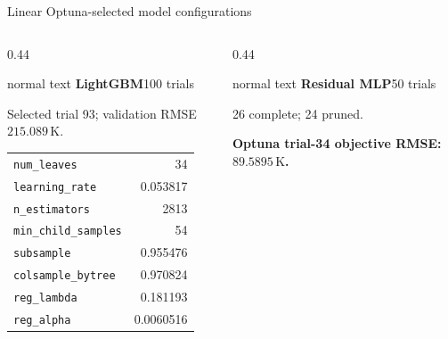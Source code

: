 \documentclass[aspectratio=169,10pt]{beamer}
\begin{document}
\begin{frame}[t]{Linear Optuna-selected model configurations}
  \hypertarget{supp:surrogates-linear-hpo}{}
  \vspace{-0.18cm}\hfill
  \hspace{0.10cm}\GVBackupIndexButton
  \vspace{0.06cm}
  \begin{columns}[T,totalwidth=0.94\textwidth]
    \begin{column}{0.44\textwidth}
      \begin{beamercolorbox}[wd=\linewidth,sep=0.48em]{normal text}
        \small\textbf{\color{GVTeal}LightGBM}\hfill\scriptsize 100 trials\par
        \vspace{0.06cm}\scriptsize Selected trial 93; validation RMSE \(215.089\,\mathrm K\).\par
        \vspace{0.08cm}\scriptsize
        \begin{tabular}{@{}lr@{}}
          \texttt{num\_leaves} & 34\\
          \texttt{learning\_rate} & 0.053817\\
          \texttt{n\_estimators} & 2813\\
          \texttt{min\_child\_samples} & 54\\
          \texttt{subsample} & 0.955476\\
          \texttt{colsample\_bytree} & 0.970824\\
          \texttt{reg\_lambda} & 0.181193\\
          \texttt{reg\_alpha} & 0.0060516
        \end{tabular}
      \end{beamercolorbox}
    \end{column}
    \begin{column}{0.44\textwidth}
      \begin{beamercolorbox}[wd=\linewidth,sep=0.48em]{normal text}
        \small\textbf{\color{GVCapacityPurple}Residual MLP}\hfill\scriptsize 50 trials\par
        \vspace{0.06cm}\scriptsize 26 complete; 24 pruned.\par
        \scriptsize\textbf{Optuna trial-34 objective RMSE: \(89.5895\,\mathrm K\).}\par

\end{beamercolorbox}
\end{column}
\end{columns}
\end{frame}
\end{document}

